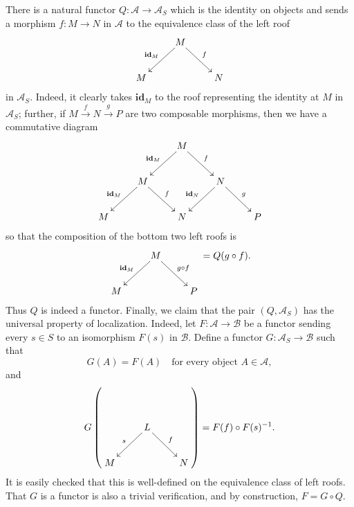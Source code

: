 \documentclass[11pt]{article}
\theoremstyle{thmstyle}
\theoremstyle{defstyle}
\newcommand{\id}{\mathbf{id}}
\newcommand{\scrA}{\mathscr{A}}
\newcommand{\scrB}{\mathscr{B}}
\begin{document}
There is a natural functor $Q\colon\scrA\to\scrA_S$ which is the identity on objects and sends a morphism $f\colon M\to N$ in $\scrA$ to the equivalence class of the left roof 
\begin{equation*}
	\xymatrix {
		& M\ar[ld]_{\id_M}\ar[rd]^f & \\
		M & & N
	}
\end{equation*}
in $\scrA_S$. Indeed, it clearly takes $\id_M$ to the roof representing the identity at $M$ in $\scrA_S$; further, if $M\xrightarrow{f} N\xrightarrow{g} P$ are two composable morphisms, then we have a commutative diagram 
\begin{equation*}
	\xymatrix {
		&& M\ar[ld]_{\id_M}\ar[rd]^f && \\
		& M\ar[ld]_{\id_M}\ar[rd]^f & & N\ar[ld]_{\id_N}\ar[rd]^g & \\
		M & & N & & P
	}
\end{equation*}
so that the composition of the bottom two left roofs is 
\begin{equation*}
	\xymatrix {
		& M\ar[ld]_{\id_M}\ar[rd]^{g\circ f} & \\
		M & & P
	} = Q(g\circ f).
\end{equation*}
Thus $Q$ is indeed a functor. Finally, we claim that the pair $(Q,\scrA_S)$ has the universal property of localization. Indeed, let $F\colon\scrA\to\scrB$ be a functor sending every $s\in S$ to an isomorphism $F(s)$ in $\scrB$. Define a functor $G\colon\scrA_S\to\scrB$ such that 
\begin{equation*}
	G(A) = F(A) \quad\text{for every object }A\in\scrA,
\end{equation*}
and 
\begin{equation*}
	G\left(
		\xymatrix{
			& L\ar[ld]_{s}\ar[rd]^f & \\
			M & & N
		}
	\right) = F(f)\circ F(s)^{-1}.
\end{equation*}
It is easily checked that this is well-defined on the equivalence class of left roofs. That $G$ is a functor is also a trivial verification, and by construction, $F = G\circ Q$.
\end{document}
